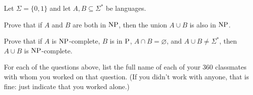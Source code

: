 \documentclass[11pt]{article}
\newcommand{\class}[1]{\textup{#1}}
\newenvironment{mylist}[1]{\begin{list}{}{
	\setlength{\leftmargin}{#1}
	\setlength{\rightmargin}{0mm}
	\setlength{\labelsep}{2mm}
	\setlength{\labelwidth}{8mm}
	\setlength{\itemsep}{0mm}}}
	{\end{list}}
\newcounter{questioncounter}
\newenvironment{question}{
  \begin{mylist}{\parindent}
  \item[\stepcounter{questioncounter}
    \thequestioncounter.]}{
\end{mylist}}
\begin{document}
\begin{question}[6 points]
  Let $\Sigma = \{0,1\}$ and let $A, B \subseteq\Sigma^{\ast}$ be
  languages.
  \begin{mylist}{8mm}
  \item[(a)]
    Prove that if $A$ and $B$ are both in $\class{NP}$, then the union $A\cup
    B$ is also in $\class{NP}$.

  \item[(b)]
    Prove that if $A$ is $\class{NP}$-complete, $B$ is in $\class{P}$, 
    $A\cap B = \varnothing$, and $A\cup B \not= \Sigma^{\ast}$, then
    $A\cup B$ is $\class{NP}$-complete.
  \end{mylist}
\end{question}


\begin{question}[1 point]
  For each of the questions above, list the full name of each of your 360
  classmates with whom you worked on that question.
  (If you didn't work with anyone, that is fine: just indicate that you worked
  alone.)
\end{question}

\end{document}
